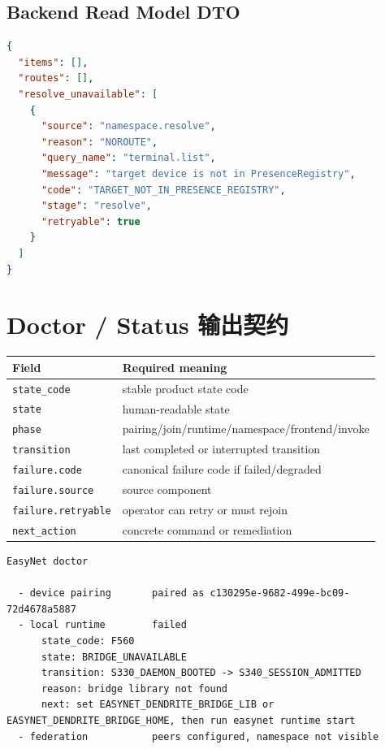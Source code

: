 \documentclass[11pt]{article}
\newcommand{\code}[1]{\texttt{#1}}
\begin{document}
\subsection{Backend Read Model DTO}

\begin{lstlisting}[language=json]
{
  "items": [],
  "routes": [],
  "resolve_unavailable": [
    {
      "source": "namespace.resolve",
      "reason": "NOROUTE",
      "query_name": "terminal.list",
      "message": "target device is not in PresenceRegistry",
      "code": "TARGET_NOT_IN_PRESENCE_REGISTRY",
      "stage": "resolve",
      "retryable": true
    }
  ]
}
\end{lstlisting}

\section{Doctor / Status 输出契约}

\begin{longtable}{L{0.22\linewidth} L{0.68\linewidth}}
\toprule
Field & Required meaning \\
\midrule
\code{state\_code} & stable product state code \\
\code{state} & human-readable state \\
\code{phase} & pairing/join/runtime/namespace/frontend/invoke \\
\code{transition} & last completed or interrupted transition \\
\code{failure.code} & canonical failure code if failed/degraded \\
\code{failure.source} & source component \\
\code{failure.retryable} & operator can retry or must rejoin \\
\code{next\_action} & concrete command or remediation \\
\bottomrule
\end{longtable}

\begin{lstlisting}[caption={doctor human output target}]
EasyNet doctor

  - device pairing       paired as c130295e-9682-499e-bc09-72d4678a5887
  - local runtime        failed
      state_code: F560
      state: BRIDGE_UNAVAILABLE
      transition: S330_DAEMON_BOOTED -> S340_SESSION_ADMITTED
      reason: bridge library not found
      next: set EASYNET_DENDRITE_BRIDGE_LIB or EASYNET_DENDRITE_BRIDGE_HOME, then run easynet runtime start
  - federation           peers configured, namespace not visible
\end{lstlisting}
\end{document}
